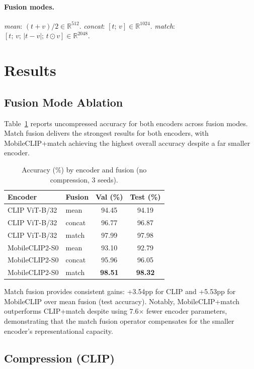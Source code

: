 \documentclass[10pt,twocolumn]{article}
\begin{document}
\paragraph{Fusion modes.}
\textit{mean}: $(t+v)/2 \in \mathbb{R}^{512}$.
\textit{concat}: $[t;\,v] \in \mathbb{R}^{1024}$.
\textit{match}: $[t;\,v;\,|t{-}v|;\,t{\odot}v] \in \mathbb{R}^{2048}$.

\section{Results}

\subsection{Fusion Mode Ablation}

Table~\ref{tab:fusion} reports uncompressed accuracy for both encoders across fusion modes.
Match fusion delivers the strongest results for both encoders, with MobileCLIP+match
achieving the highest overall accuracy despite a far smaller encoder.

\begin{table}[h]
\centering
\caption{Accuracy (\%) by encoder and fusion (no compression, 3 seeds).}
\label{tab:fusion}
\begin{tabular}{llcc}
\toprule
Encoder & Fusion & Val (\%) & Test (\%) \\
\midrule
CLIP ViT-B/32   & mean   & 94.45 & 94.19 \\
CLIP ViT-B/32   & concat & 96.77 & 96.87 \\
CLIP ViT-B/32   & match  & 97.99 & 97.98 \\
\midrule
MobileCLIP2-S0  & mean   & 93.10 & 92.79 \\
MobileCLIP2-S0  & concat & 95.96 & 96.05 \\
MobileCLIP2-S0  & match  & \textbf{98.51} & \textbf{98.32} \\
\bottomrule
\end{tabular}
\end{table}

Match fusion provides consistent gains: +3.54pp for CLIP and +5.53pp for MobileCLIP over
mean fusion (test accuracy). Notably, MobileCLIP+match outperforms CLIP+match despite using 7.6$\times$
fewer encoder parameters, demonstrating that the match fusion operator compensates for
the smaller encoder's representational capacity.

\subsection{Compression (CLIP)}
\end{document}
